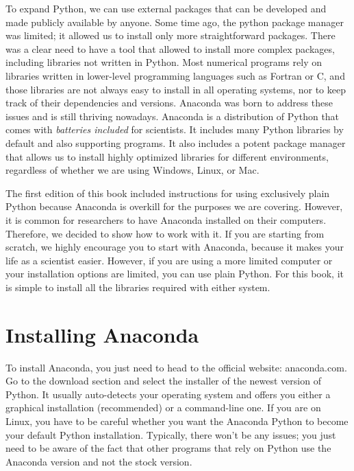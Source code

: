 To expand Python, we can use external packages that can be developed and made publicly available by anyone. Some time ago, the python package manager was limited; it allowed us to install only more straightforward packages. There was a clear need to have a tool that allowed to install more complex packages, including libraries not written in Python. Most numerical programs rely on libraries written in lower-level programming languages such as Fortran or C, and those libraries are not always easy to install in all operating systems, nor to keep track of their dependencies and versions. Anaconda was born to address these issues and is still thriving nowadays. Anaconda is a distribution of Python that comes with \emph{batteries included} for scientists. It includes many Python libraries by default and also supporting programs. It also includes a potent package manager that allows us to install highly optimized libraries for different environments, regardless of whether we are using Windows, Linux, or Mac.

The first edition of this book included instructions for using exclusively plain Python because Anaconda is overkill for the purposes we are covering. However, it is common for researchers to have Anaconda installed on their computers. Therefore, we decided to show how to work with it. If you are starting from scratch, we highly encourage you to start with Anaconda, because it makes your life as a scientist easier. However, if you are using a more limited computer or your installation options are limited, you can use plain Python. For this book, it is simple to install all the libraries required with either system.

\section{Installing Anaconda}\label{sec:installing-anaconda}
To install Anaconda, you just need to head to the official website: anaconda.com. Go to the download section and select the installer of the newest version of Python. It usually auto-detects your operating system and offers you either a graphical installation (recommended) or a command-line one. If you are on Linux, you have to be careful whether you want the Anaconda Python to become your default Python installation. Typically, there won't be any issues; you just need to be aware of the fact that other programs that rely on Python use the Anaconda version and not the stock version.


